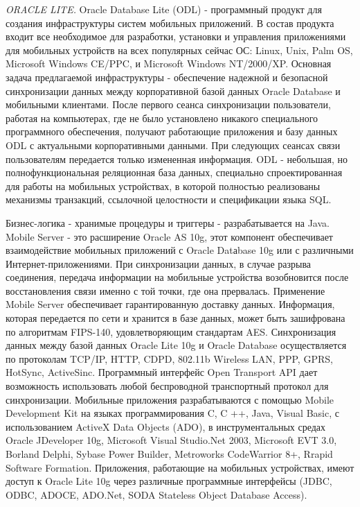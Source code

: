 \textit{ORACLE LITE.}
Oracle Database Lite (ODL) - программный продукт для создания инфраструктуры систем мобильных приложений. В состав продукта входит все необходимое для разработки, установки и управления приложениями для мобильных устройств на всех популярных сейчас ОС: Linux, Unix, Palm OS, Microsoft Windows CE/PPC, и Microsoft Windows NT/2000/XP. Основная задача предлагаемой инфраструктуры - обеспечение надежной и безопасной синхронизации данных между корпоративной базой данных Oracle Database и мобильными клиентами. После первого сеанса синхронизации пользователи, работая на компьютерах, где не было установлено никакого специального программного обеспечения, получают работающие приложения и базу данных ODL с актуальными корпоративными данными. При следующих сеансах связи пользователям передается только измененная информация. ODL - небольшая, но полнофункциональная реляционная база данных, специально спроектированная для работы на мобильных устройствах, в которой полностью реализованы механизмы транзакций, ссылочной целостности и спецификации языка SQL.

Бизнес-логика - хранимые процедуры и триггеры - разрабатывается на Java. Mobile Server - это расширение Oracle AS 10g, этот компонент обеспечивает взаимодействие мобильных приложений с Oracle Datаbase 10g или с различными Интернет-приложениями. При синхронизации данных, в случае разрыва соединения, передача информации на мобильные устройства возобновится после восстановления связи именно с той точки, где она прервалась. Применение Mobile Server обеспечивает гарантированную доставку данных. Информация, которая передается по сети и хранится в базе данных, может быть зашифрована по алгоритмам FIPS-140, удовлетворяющим стандартам AES. Синхронизация данных между базой данных Oracle Lite 10g и Oracle Database осуществляется по протоколам TCP/IP, HTTP, CDPD, 802.11b Wireless LAN, PPP, GPRS, HotSync, ActiveSinc. Программный интерфейс Open Transport API дает возможность использовать любой беспроводной транспортный протокол для синхронизации. Мобильные приложения разрабатываются с помощью Mobile Development Kit на языках программирования C, C ++, Java, Visual Basic, с использованием ActiveX Data Objects (ADO), в инструментальных средах Oracle JDeveloper 10g, Microsoft Visual Studio.Net 2003, Microsoft EVT 3.0, Borland Delphi, Sybase Power Builder, Metroworks CodeWarrior 8+, Rrapid Software Formation. Приложения, работающие на мобильных устройствах, имеют доступ к Oracle Lite 10g через различные программные интерфейсы (JDBC, ODBC, ADOCE, ADO.Net, SODA Stateless Object Database Access).

